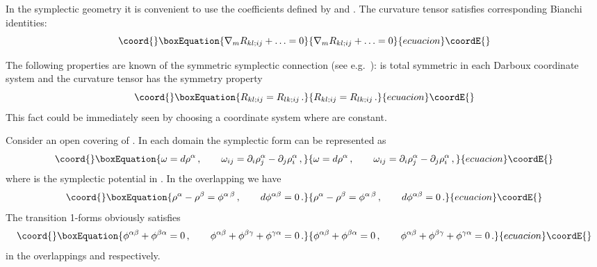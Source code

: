 \documentclass[a4paper,11pt,oneside]{amsart}
\theoremstyle{plain}
\numberwithin{equation}{section} %
\numberwithin{figure}{section} %
\def\d{\partial}
\def\manM{{\mathcal M}}
\begin{document}
\noindent
In the symplectic geometry it is convenient to use the coefficients
\coordHE{} defined by \coordHE{}
and \coordHE{}.  The curvature
tensor \coordHE{} satisfies corresponding Bianchi
identities:
\begin{equation}\coord{}\boxEquation{
\label{Bianchi}
\nabla_m R_{kl;ij} + \ldots = 0
}{
\nabla_m R_{kl;ij} + \ldots = 0
}{ecuacion}\coordE{}\end{equation}


\noindent
The following properties are known of the symmetric symplectic
connection (see e.g.~\cite{[GRS]}): \coordHE{} is total symmetric
in each Darboux coordinate system and the curvature tensor has the symmetry
property
\begin{equation}\coord{}\boxEquation{
        R_{kl;ij}=R_{lk;ij}\,.
}{
        R_{kl;ij}=R_{lk;ij}\,.
}{ecuacion}\coordE{}\end{equation}
This fact could be immediately seen by choosing a coordinate system
where \coordHE{} are constant.

\noindent
Consider an open covering of \myHighlight{$\manM$}\coordHE{}.  In each
domain \coordHE{} the symplectic form can be represented as
\begin{equation}\coord{}\boxEquation{ \label{eq:rho} \omega=d\rho^\alpha\,, \qquad
        \omega_{ij}=\d_i\rho^\alpha_j-\d_j\rho^\alpha_i\,,
}{ \omega=d\rho^\alpha\,, \qquad
        \omega_{ij}=\d_i\rho^\alpha_j-\d_j\rho^\alpha_i\,,
}{ecuacion}\coordE{}\end{equation}
where \coordHE{} is the symplectic potential
in \coordHE{}.  In the overlapping \coordHE{} we have
\begin{equation}\coord{}\boxEquation{
  \rho^\alpha-\rho^\beta=\phi^{\alpha\,\beta}\,, \qquad
  d\phi^{\alpha\beta}=0\,.
}{
  \rho^\alpha-\rho^\beta=\phi^{\alpha\,\beta}\,, \qquad
  d\phi^{\alpha\beta}=0\,.
}{ecuacion}\coordE{}\end{equation}
The transition 1-forms \myHighlight{$\phi^{\alpha\beta}$}\coordHE{} obviously satisfies
\begin{equation}\coord{}\boxEquation{
\phi^{\alpha\beta}+\phi^{\beta\alpha}=0\,,\qquad
\phi^{\alpha\beta}+\phi^{\beta\gamma}+\phi^{\gamma\alpha}=0\,.
}{
\phi^{\alpha\beta}+\phi^{\beta\alpha}=0\,,\qquad
\phi^{\alpha\beta}+\phi^{\beta\gamma}+\phi^{\gamma\alpha}=0\,.
}{ecuacion}\coordE{}\end{equation}
in the overlappings \coordHE{} and
\coordHE{} respectively.
\end{document}
